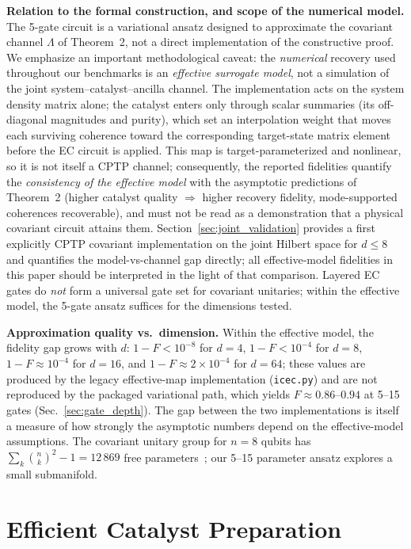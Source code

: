 \documentclass[a4paper,twocolumn]{quantumarticle}
\begin{document}
\textbf{Relation to the formal construction, and scope of the numerical model.}
The 5-gate circuit is a variational ansatz designed to approximate the covariant channel $\Lambda$ of Theorem~2, not a direct implementation of the constructive proof.
We emphasize an important methodological caveat: the \emph{numerical} recovery used throughout our benchmarks is an \emph{effective surrogate model}, not a simulation of the joint system--catalyst--ancilla channel.
The implementation acts on the system density matrix alone; the catalyst enters only through scalar summaries (its off-diagonal magnitudes and purity), which set an interpolation weight that moves each surviving coherence toward the corresponding target-state matrix element before the EC circuit is applied.
This map is target-parameterized and nonlinear, so it is not itself a CPTP channel; consequently, the reported fidelities quantify the \emph{consistency of the effective model} with the asymptotic predictions of Theorem~2 (higher catalyst quality $\Rightarrow$ higher recovery fidelity, mode-supported coherences recoverable), and must not be read as a demonstration that a physical covariant circuit attains them.
Section~\ref{sec:joint_validation} provides a first explicitly CPTP covariant implementation on the joint Hilbert space for $d \leq 8$ and quantifies the model-vs-channel gap directly; all effective-model fidelities in this paper should be interpreted in the light of that comparison.
Layered EC gates do \emph{not} form a universal gate set for covariant unitaries; within the effective model, the 5-gate ansatz suffices for the dimensions tested.

\textbf{Approximation quality vs.\ dimension.}
Within the effective model, the fidelity gap grows with $d$: $1 - F < 10^{-8}$ for $d = 4$, $1 - F < 10^{-4}$ for $d = 8$, $1 - F \approx 10^{-4}$ for $d = 16$, and $1 - F \approx 2 \times 10^{-4}$ for $d = 64$; these values are produced by the legacy effective-map implementation (\texttt{icec.py}) and are not reproduced by the packaged variational path, which yields $F \approx 0.86$--$0.94$ at 5--15 gates (Sec.~\ref{sec:gate_depth}).
The gap between the two implementations is itself a measure of how strongly the asymptotic numbers depend on the effective-model assumptions.
The covariant unitary group for $n = 8$ qubits has $\sum_k \binom{n}{k}^2 - 1 = 12\,869$ free parameters~\cite{Schuch2004}; our 5--15 parameter ansatz explores a small submanifold.


\section{Efficient Catalyst Preparation}
\label{sec:catalyst_prep}
\end{document}
